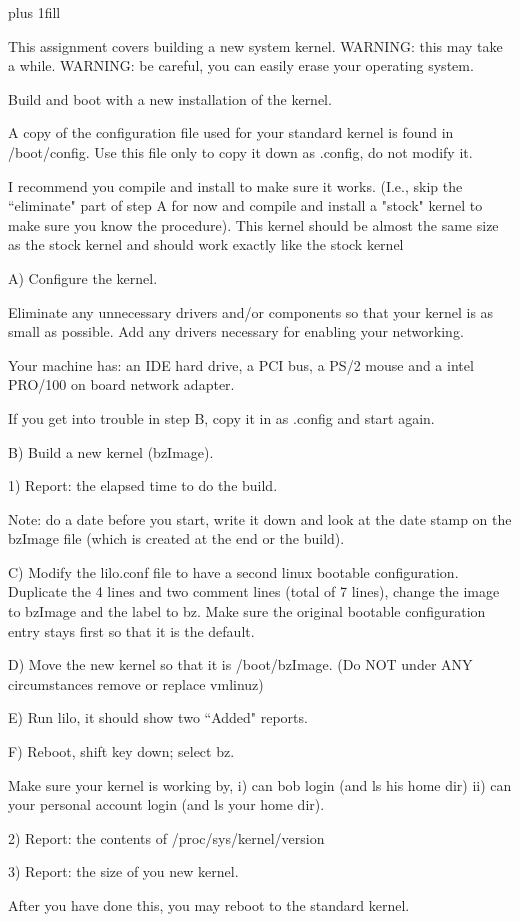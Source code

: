 
\rightskip=0pt plus 1fill

\parindent 0pt

This assignment covers building a new system kernel.
WARNING: this may take a while.
WARNING: be careful, you can easily erase your operating system.

Build and boot with a new installation of the kernel.

A copy of the configuration file used for your standard kernel
is found in {\ltt{}/boot/config}. Use this file only
to copy it down as {\ltt{}.config}, do not modify it.

I recommend you compile and install to make sure it works.
(I.e., skip the ``eliminate" part of step A for now and compile and
install a "stock" kernel to
make sure you know the procedure).
This kernel should be almost the same size as the stock kernel and should
work exactly like the stock kernel

A) Configure the kernel. 

Eliminate any unnecessary drivers and/or components so that your kernel is
as small as possible.
Add any drivers necessary for enabling your networking.

Your machine has:
an IDE hard drive, a PCI bus, a PS/2 mouse
and
a intel PRO/100 on board network adapter.

If you get into trouble in step B, copy it in as {\ltt{}.config}
and start again.

B) Build a new kernel ({\ltt{}bzImage}).

1) Report: the elapsed time to do the build.

Note: do a date before you start, write it down and look at
the date stamp on the {\ltt{}bzImage} file (which is created at
the end or the build).

C) Modify the {\ltt{}lilo.conf} file to have a second linux
bootable configuration.
Duplicate the 4 lines and two comment lines (total of 7 lines),
change the image to {\ltt{}bzImage} and the label to {\ltt{}bz}.
Make sure the original bootable configuration entry stays first so that
it is the default.

D) Move the new kernel so that it is {\ltt{}/boot/bzImage}.
(Do NOT under ANY circumstances remove or replace {\ltt{}vmlinuz})

E) Run lilo, it should show two ``Added" reports.

F) Reboot, shift key down; select bz.

Make sure your kernel is working by,
i) can bob login (and ls his home dir)
ii) can your personal account login (and ls your home dir). 

2) Report: the contents of {\ltt{}/proc/sys/kernel/version} 

3) Report: the size of you new kernel.

After you have done this, you may reboot to the standard kernel.
\bye
